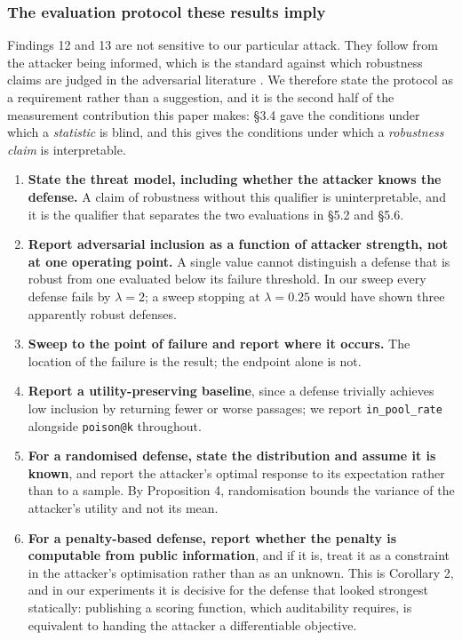 \documentclass[authoryear,review,3p,times]{elsarticle}
\providecommand{\tightlist}{%
  \setlength{\itemsep}{0pt}\setlength{\parskip}{0pt}}
\begin{document}
\subsubsection{The evaluation protocol these results imply}\label{the-evaluation-protocol-these-results-imply}

Findings 12 and 13 are not sensitive to our particular attack. They follow from the attacker being informed, which is the standard against which robustness claims are judged in the adversarial literature \citep{carlini2019,tramer2020}. We therefore state the protocol as a requirement rather than a suggestion, and it is the second half of the measurement contribution this paper makes: §3.4 gave the conditions under which a \emph{statistic} is blind, and this gives the conditions under which a \emph{robustness claim} is interpretable.

\begin{enumerate}
\def\labelenumi{\arabic{enumi}.}
\tightlist
\item
  \textbf{State the threat model, including whether the attacker knows the defense.} A claim of robustness without this qualifier is uninterpretable, and it is the qualifier that separates the two evaluations in §5.2 and §5.6.
\item
  \textbf{Report adversarial inclusion as a function of attacker strength, not at one operating point.} A single value cannot distinguish a defense that is robust from one evaluated below its failure threshold. In our sweep every defense fails by \(\lambda = 2\); a sweep stopping at \(\lambda = 0.25\) would have shown three apparently robust defenses.
\item
  \textbf{Sweep to the point of failure and report where it occurs.} The location of the failure is the result; the endpoint alone is not.
\item
  \textbf{Report a utility-preserving baseline}, since a defense trivially achieves low inclusion by returning fewer or worse passages; we report \texttt{in\_pool\_rate} alongside \texttt{poison@k} throughout.
\item
  \textbf{For a randomised defense, state the distribution and assume it is known}, and report the attacker's optimal response to its expectation rather than to a sample. By Proposition 4, randomisation bounds the variance of the attacker's utility and not its mean.
\item
  \textbf{For a penalty-based defense, report whether the penalty is computable from public information}, and if it is, treat it as a constraint in the attacker's optimisation rather than as an unknown. This is Corollary 2, and in our experiments it is decisive for the defense that looked strongest statically: publishing a scoring function, which auditability requires, is equivalent to handing the attacker a differentiable objective.
\end{enumerate}
\end{document}

